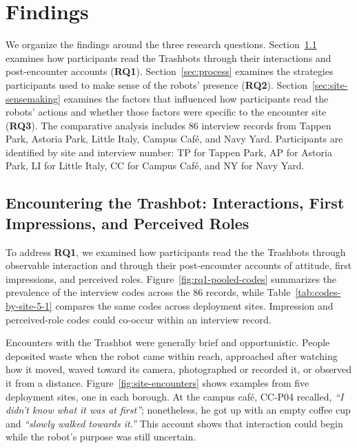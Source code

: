 \section{Findings}
\label{sec:findings}

We organize the findings around the three research questions. Section~\ref{sec:encounters} examines how participants read the Trashbots through their interactions and post-encounter accounts (\textbf{RQ1}). Section~\ref{sec:process} examines the strategies participants used to make sense of the robots' presence (\textbf{RQ2}). Section~\ref{sec:site-sensemaking} examines the factors that influenced how participants read the robots' actions and whether those factors were specific to the encounter site (\textbf{RQ3}). The comparative analysis includes 86 interview records from Tappen Park, Astoria Park, Little Italy, Campus Caf\'e, and Navy Yard. Participants are identified by site and interview number: TP for Tappen Park, AP for Astoria Park, LI for Little Italy, CC for Campus Caf\'e, and NY for Navy Yard.

\subsection{Encountering the Trashbot: Interactions, First Impressions, and Perceived Roles}
\label{sec:encounters}

To address \textbf{RQ1}, we examined how participants read the the Trashbots through observable interaction and through their post-encounter accounts of attitude, first impressions, and perceived roles. Figure~\ref{fig:rq1-pooled-codes} summarizes the prevalence of the interview codes across the 86 records, while Table~\ref{tab:codes-by-site-5-1} compares the same codes across deployment sites. Impression and perceived-role codes could co-occur within an interview record.

Encounters with the Trashbot were generally brief and opportunistic. People deposited waste when the robot came within reach, approached after watching how it moved, waved toward its camera, photographed or recorded it, or observed it from a distance. Figure~\ref{fig:site-encounters} shows examples from five deployment sites, one in each borough. At the campus caf\'e, CC-P04 recalled, \emph{``I didn't know what it was at first''}; nonetheless, he got up with an empty coffee cup and \emph{``slowly walked towards it.''} This account shows that interaction could begin while the robot's purpose was still uncertain.

